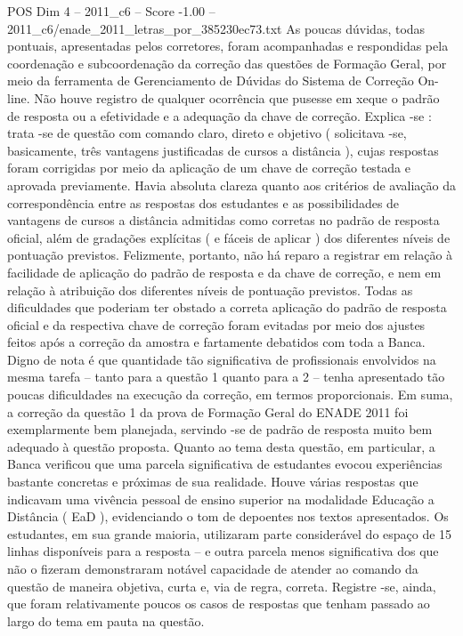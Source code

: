 \begin{textsample}{POS Dim 4 – 2011\_c6 – Score -1.00 – 2011\_c6/enade\_2011\_letras\_por\_385230ec73.txt}
As poucas dúvidas, todas pontuais, apresentadas pelos corretores, foram acompanhadas e respondidas pela coordenação e subcoordenação da correção das questões de Formação Geral, por meio da ferramenta de Gerenciamento de Dúvidas do Sistema de Correção On-line.
Não houve registro de qualquer ocorrência que pusesse em xeque o padrão de resposta ou a efetividade e a adequação da chave de correção.
Explica -se : trata -se de questão com comando claro, direto e objetivo ( solicitava -se, basicamente, três vantagens justificadas de cursos a distância ), cujas respostas foram corrigidas por meio da aplicação de um chave de correção testada e aprovada previamente.
Havia absoluta clareza quanto aos critérios de avaliação da correspondência entre as respostas dos estudantes e as possibilidades de vantagens de cursos a distância admitidas como corretas no padrão de resposta oficial, além de gradações explícitas ( e fáceis de aplicar ) dos diferentes níveis de pontuação previstos.
Felizmente, portanto, não há reparo a registrar em relação à facilidade de aplicação do padrão de resposta e da chave de correção, e nem em relação à atribuição dos diferentes níveis de pontuação previstos.
Todas as dificuldades que poderiam ter obstado a correta aplicação do padrão de resposta oficial e da respectiva chave de correção foram evitadas por meio dos ajustes feitos após a correção da amostra e fartamente debatidos com toda a Banca.
Digno de nota é que quantidade tão significativa de profissionais envolvidos na mesma tarefa – tanto para a questão 1 quanto para a 2 – tenha apresentado tão poucas dificuldades na execução da correção, em termos proporcionais.
Em suma, a correção da questão 1 da prova de Formação Geral do ENADE 2011 foi exemplarmente bem planejada, servindo -se de padrão de resposta muito bem adequado à questão proposta.
Quanto ao tema desta questão, em particular, a Banca verificou que uma parcela significativa de estudantes evocou experiências bastante concretas e próximas de sua realidade.
Houve várias respostas que indicavam uma vivência pessoal de ensino superior na modalidade Educação a Distância ( EaD ), evidenciando o tom de depoentes nos textos apresentados.
Os estudantes, em sua grande maioria, utilizaram parte considerável do espaço de 15 linhas disponíveis para a resposta – e outra parcela menos significativa dos que não o fizeram demonstraram notável capacidade de atender ao comando da questão de maneira objetiva, curta e, via de regra, correta.
Registre -se, ainda, que foram relativamente poucos os casos de respostas que tenham passado ao largo do tema em pauta na questão.

\end{textsample}
